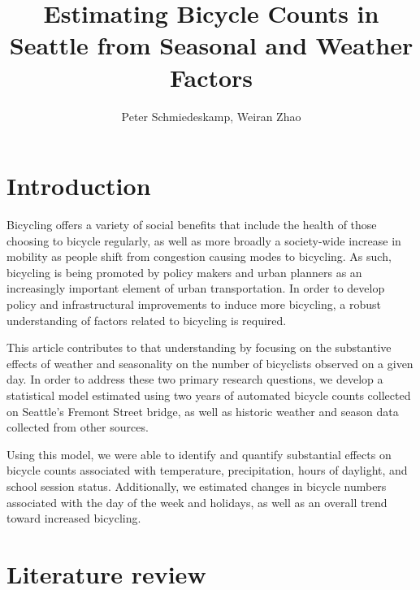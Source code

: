 \documentclass[12pt,letterpaper,article,twocolumn]{memoir}
\title{Estimating Bicycle Counts in Seattle from Seasonal and Weather Factors}
\author{Peter Schmiedeskamp, Weiran Zhao}
\begin{document}
\maketitle

\section*{Introduction}
%
% 

Bicycling offers a variety of social benefits that include the health
of those choosing to bicycle regularly, as well as more broadly a
society-wide increase in mobility as people shift from congestion
causing modes to bicycling. As such, bicycling is being promoted by
policy makers and urban planners as an increasingly important element
of urban transportation. In order to develop policy and
infrastructural improvements to induce more bicycling, a robust
understanding of factors related to bicycling is required.

This article contributes to that understanding by focusing on the
substantive effects of weather and seasonality on the number of
bicyclists observed on a given day. In order to address these two
primary research questions, we develop a statistical model estimated
using two years of automated bicycle counts collected on Seattle's
Fremont Street bridge, as well as historic weather and season data
collected from other sources.

Using this model, we were able to identify and quantify substantial
effects on bicycle counts associated with temperature, precipitation,
hours of daylight, and school session status. Additionally, we
estimated changes in bicycle numbers associated with the day of the
week and holidays, as well as an overall trend toward increased
bicycling.

\section*{Literature review}
% 
% 
\end{document}
